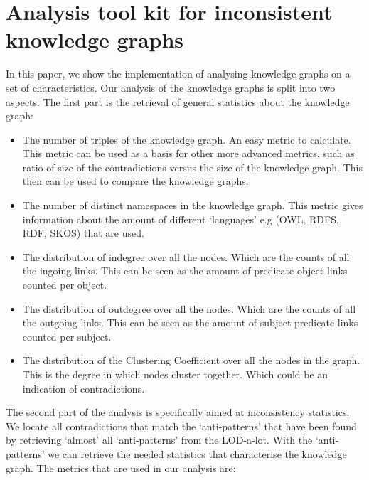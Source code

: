\documentclass[11pt,letterpaper ,oneside ]{book}
\begin{document}
	\section{Analysis tool kit for inconsistent knowledge graphs}
	In this paper, we show the implementation of analysing knowledge graphs on a set of characteristics. Our analysis of the knowledge graphs is split into two aspects. The first part is the retrieval of general statistics about the knowledge graph:
	\begin{itemize}
		\item The number of triples of the knowledge graph. An easy metric to calculate. This metric can be used as a basis for other more advanced metrics, such as ratio of size of the contradictions versus the size of the knowledge graph. This then can be used to compare the knowledge graphs.
		\item The number of distinct namespaces in the knowledge graph. This metric gives information about the amount of different `languages' e.g (OWL, RDFS, RDF, SKOS) that are used. 
		\item The distribution of indegree over all the nodes. Which are the counts of all the ingoing links. This can be seen as the amount of predicate-object links counted per object.
		\item The distribution of outdegree over all the nodes. Which are the counts of all the outgoing links. This can be seen as the amount of subject-predicate links counted per subject.
		\item The distribution of the Clustering Coefficient over all the nodes in the graph. This is the degree in which nodes cluster together. Which could be an indication of contradictions.  
	\end{itemize}
	The second part of the analysis is specifically aimed at inconsistency statistics. We locate all contradictions that match the `anti-patterns' that have been found by retrieving `almost' all `anti-patterns' from the LOD-a-lot. With the `anti-patterns' we can retrieve the needed statistics that characterise the knowledge graph. The metrics that are used in our analysis are:
	
\end{document}
